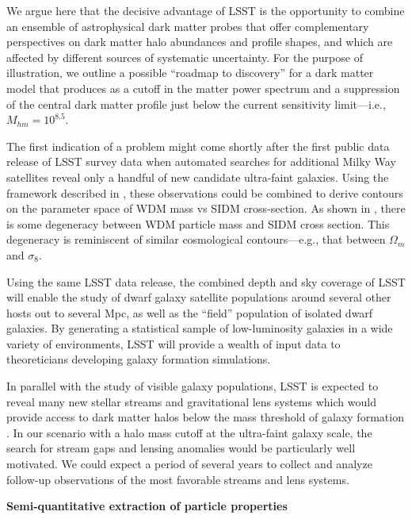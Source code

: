We argue here that the decisive advantage of LSST is the opportunity to combine an ensemble of astrophysical dark matter probes that offer complementary perspectives on dark matter halo abundances and profile shapes, and which are affected by different sources of systematic uncertainty.
For the purpose of illustration, we outline a possible ``roadmap to discovery'' for a dark matter model that produces as a cutoff in the matter power spectrum and a suppression of the central dark matter profile just below the current sensitivity limit---i.e., $M_{hm} = 10^{8.5}$.

The first indication of a problem might come shortly after the first public data release of LSST survey data when automated searches for additional Milky Way satellites reveal only a handful of new candidate ultra-faint galaxies. 
Using the framework described in , these observations could be combined to derive contours on the parameter space of WDM mass vs SIDM cross-section.
As shown in , there is some degeneracy between WDM particle mass and SIDM cross section.
This degeneracy is reminiscent of similar cosmological contours---e.g., that between $\Omega_m$ and $\sigma_8$.

Using the same LSST data release, the combined depth and sky coverage of LSST will enable the study of dwarf galaxy satellite populations around several other hosts out to several Mpc, as well as the ``field'' population of isolated dwarf galaxies.
By generating a statistical sample of low-luminosity galaxies in a wide variety of environments, LSST will provide a wealth of input data to theoreticians developing galaxy formation simulations.

In parallel with the study of visible galaxy populations, LSST is expected to reveal many new stellar streams and gravitational lens systems which would provide access to dark matter halos below the mass threshold of galaxy formation .
In our scenario with a halo mass cutoff at the ultra-faint galaxy scale, the search for stream gaps and lensing anomalies would be particularly well motivated.
We could expect a period of several years to collect and analyze follow-up observations of the most favorable streams and lens systems.

{\bf Semi-quantitative extraction of particle properties}

